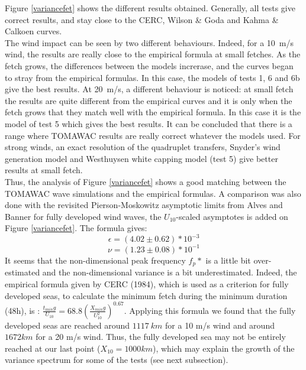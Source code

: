 Figure \ref{variancefet} shows the different results obtained. Generally, all tests give correct results, and stay close to the CERC, Wilson \& Goda and Kahma \& Calkoen curves.\\
The wind impact can be seen by two different behaviours. Indeed, for a 10~m/s wind, the results are really close to the empirical formula at small fetches. As the fetch grows, the differences between the models increrase, and the curves began to stray from the empirical formulas. In this case, the models of tests 1, 6 and 6b give the best results. At 20~m/s, a different behaviour is noticed: at small fetch the results are quite different from the empirical curves and it is only when the fetch grows that they match well with the empirical formula. In this case it is the model of test 5 which gives the best results. It can be concluded that there is a range where TOMAWAC results are really correct whatever the models used. For strong winds, an exact resolution of the quadruplet transfers, Snyder's wind generation model and Westhuysen white capping model (test 5) give better results at small fetch. \\
Thus, the analysis of Figure \ref{variancefet} shows a good matching between the  TOMAWAC wave simulations and the empirical formulas. A comparison was also done with the revisited Pierson-Moskowitz asymptotic limits from Alves and Banner \cite{Alves2003} for fully developed wind waves, the $U_{10}$-scaled asymptotes is added on Figure \ref{variancefet}. The formula gives:
\[\epsilon = (4.02 \pm 0.62)*10^{-3}\]
\[\nu = (1.23 \pm 0.08)* 10^{-1}\]
 It seems that the non-dimensional peak frequency $f_p*$ is a little bit over-estimated and the non-dimensional variance is a bit underestimated. Indeed, the empirical formula given by CERC (1984), which is used as a criterion for fully developed seas, to calculate the minimum fetch during the minimum duration (48h), is : $\frac{t_{min} g}{U_{10}} = 68.8 (\frac{X_{min} g}{U_{10}^2})^{0.67}$. Applying this formula we found that the fully developed seas are reached around $1 117~km$ for a 10 m/s wind and around $1 672 km$ for a 20 m/s wind. Thus, the fully developed sea may not be entirely reached at our last point ($X_{10} = 1000km$), which may explain the growth of the variance spectrum for some of the tests (see next subsection).

